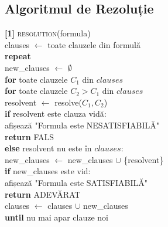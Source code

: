 \documentclass[12pt,a4paper]{article}
\begin{document}
\subsection{Algoritmul de Rezoluție}
\begin{flushleft}
\textbf{[1]} \textsc{resolution}(formula)\\
\hspace*{1em}clauses \(\leftarrow\) toate clauzele din formulă\\
\hspace*{1em}\textbf{repeat}\\
\hspace*{2em}new\_clauses \(\leftarrow\) \(\emptyset\)\\
\hspace*{2em}\textbf{for} toate clauzele \(C_1\) din \(clauses\)\\
\hspace*{3em}\textbf{for} toate clauzele \(C_2 > C_1\) din \(clauses\)\\
\hspace*{4em}resolvent \(\leftarrow\) resolve(\(C_1, C_2\))\\
\hspace*{4em}\textbf{if} resolvent este clauza vidă:\\
\hspace*{5em}afișează "Formula este NESATISFIABILĂ"\\
\hspace*{5em}\textbf{return} FALS\\
\hspace*{4em}\textbf{else} resolvent nu este în \(clauses\):\\
\hspace*{5em}new\_clauses \(\leftarrow\) new\_clauses \(\cup\) \{resolvent\}\\
\hspace*{2em}\textbf{if} new\_clauses este vid:\\
\hspace*{3em}afișează "Formula este SATISFIABILĂ"\\
\hspace*{3em}\textbf{return} ADEVĂRAT\\
\hspace*{2em}clauses \(\leftarrow\) clauses \(\cup\) new\_clauses\\
\textbf{until} nu mai apar clauze noi
\end{flushleft}
\end{document}
